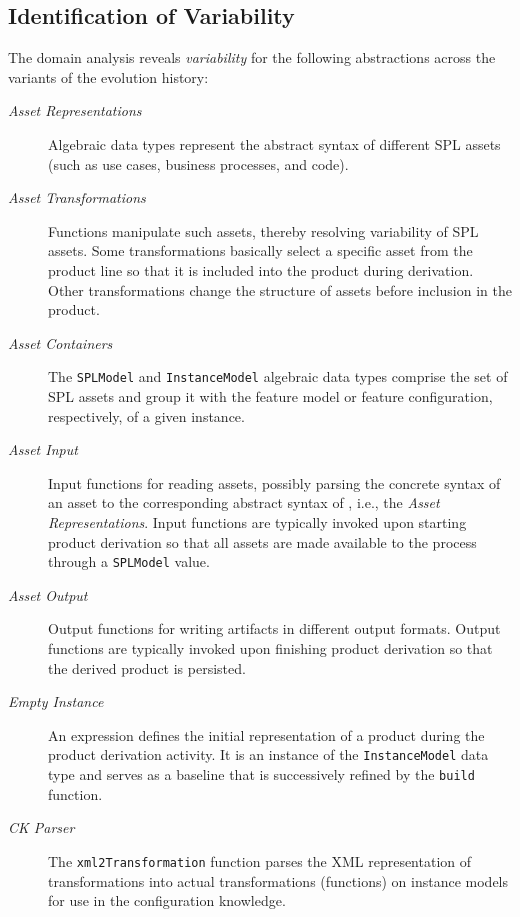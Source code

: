 
\subsection{Identification of Variability} 
\label{sec:variability}

The domain analysis reveals \emph{variability} for the following abstractions across the variants of the evolution history:

\newcommand{\assetr}{\emph{Asset Representations}}
\newcommand{\assetx}{\emph{Asset Transformations}}
\newcommand{\asseti}{\emph{Asset Input}}
\newcommand{\asseto}{\emph{Asset Output}}
\newcommand{\assetc}{\emph{Asset Containers}}
\newcommand{\emptyi}{\emph{Empty Instance}}
\newcommand{\ckparser}{\emph{CK Parser}}

\begin{description}

\item[\assetr] Algebraic data types represent the abstract syntax of different SPL assets (such as use cases, business processes, and code).

\item[\assetx] Functions manipulate such assets, thereby resolving variability of SPL assets. Some transformations basically select a specific asset from the product line so that it is included into the product during derivation. Other transformations change the structure of assets before inclusion in the product.

\item[\assetc] The \texttt{SPLModel} and \texttt{InstanceModel} algebraic data types comprise the set of SPL assets and group it with the feature model or feature configuration, respectively, of a given \hpl{} instance.

\item[\asseti] Input functions for reading assets, possibly parsing the concrete syntax of an asset to the corresponding abstract syntax of \hpl{}, i.e., the \assetr. Input functions are typically invoked upon starting product derivation so that all assets are made available to the process through a \texttt{SPLModel} value.

\item[\asseto] Output functions for writing artifacts in different output formats. Output functions are typically invoked upon finishing product derivation so that the derived product is persisted.

\item[\emptyi] An expression defines the initial representation of a product during the product derivation activity. It is an instance of the \texttt{InstanceModel} data type and serves as a baseline that is successively refined by the \texttt{build} function.

\item[\ckparser] The \texttt{xml2Transformation} function parses the XML representation of transformations into actual transformations (functions) on instance models for use in the configuration knowledge.

\end{description}

